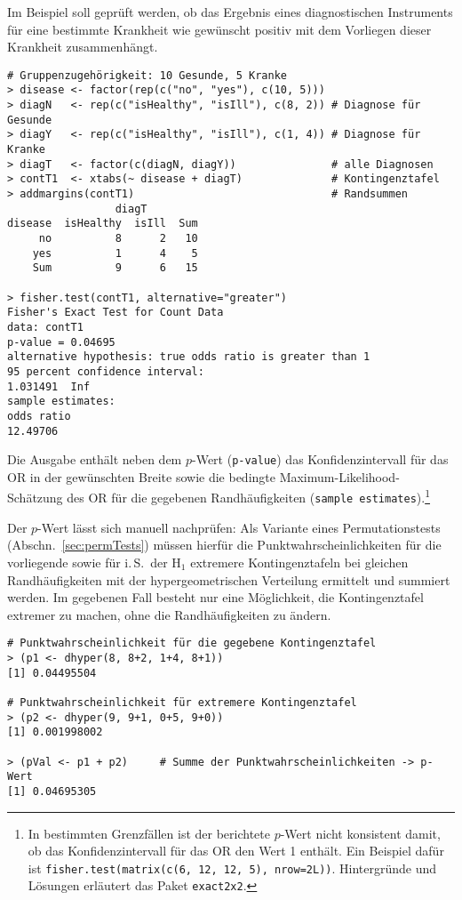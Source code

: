 Im Beispiel soll geprüft werden, ob das Ergebnis eines diagnostischen Instruments für eine bestimmte Krankheit wie gewünscht positiv mit dem Vorliegen dieser Krankheit zusammenhängt.
\begin{lstlisting}
# Gruppenzugehörigkeit: 10 Gesunde, 5 Kranke
> disease <- factor(rep(c("no", "yes"), c(10, 5)))
> diagN   <- rep(c("isHealthy", "isIll"), c(8, 2)) # Diagnose für Gesunde
> diagY   <- rep(c("isHealthy", "isIll"), c(1, 4)) # Diagnose für Kranke
> diagT   <- factor(c(diagN, diagY))               # alle Diagnosen
> contT1  <- xtabs(~ disease + diagT)              # Kontingenztafel
> addmargins(contT1)                               # Randsummen
                 diagT
disease  isHealthy  isIll  Sum
     no          8      2   10
    yes          1      4    5
    Sum          9      6   15

> fisher.test(contT1, alternative="greater")
Fisher's Exact Test for Count Data
data: contT1
p-value = 0.04695
alternative hypothesis: true odds ratio is greater than 1
95 percent confidence interval:
1.031491  Inf
sample estimates:
odds ratio
12.49706
\end{lstlisting}

Die Ausgabe enthält neben dem $p$-Wert (\lstinline!p-value!) das Konfidenzintervall für das OR in der gewünschten Breite sowie die bedingte Maximum-Likelihood-Schätzung des OR für die gegebenen Randhäufigkeiten (\lstinline!sample estimates!).\footnote{\label{ftn:fisherIncons}In bestimmten Grenzfällen ist der berichtete $p$-Wert nicht konsistent damit, ob das Konfidenzintervall für das OR den Wert 1 enthält. Ein Beispiel dafür ist \lstinline!fisher.test(matrix(c(6, 12, 12, 5), nrow=2L))!. Hintergründe und Lösungen erläutert das Paket \lstinline!exact2x2!.}

Der $p$-Wert lässt sich manuell nachprüfen: Als Variante eines Permutationstests (Abschn.\ \ref{sec:permTests}) müssen hierfür die Punktwahrscheinlichkeiten für die vorliegende sowie für i.\,S.\ der $\text{H}_{1}$ extremere Kontingenztafeln bei gleichen Randhäufigkeiten mit der hypergeometrischen Verteilung ermittelt und summiert werden. Im gegebenen Fall besteht nur eine Möglichkeit, die Kontingenztafel extremer zu machen, ohne die Randhäufigkeiten zu ändern.
\begin{lstlisting}
# Punktwahrscheinlichkeit für die gegebene Kontingenztafel
> (p1 <- dhyper(8, 8+2, 1+4, 8+1))
[1] 0.04495504

# Punktwahrscheinlichkeit für extremere Kontingenztafel
> (p2 <- dhyper(9, 9+1, 0+5, 9+0))
[1] 0.001998002

> (pVal <- p1 + p2)     # Summe der Punktwahrscheinlichkeiten -> p-Wert
[1] 0.04695305
\end{lstlisting}

